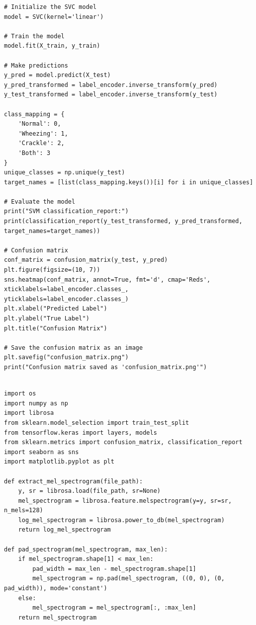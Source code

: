 \documentclass[conference]{IEEEtran}
\begin{document}
{\begin{lstlisting}[style=mypython, caption={Python code for SVM Model}]
# Initialize the SVC model
model = SVC(kernel='linear')

# Train the model
model.fit(X_train, y_train)

# Make predictions
y_pred = model.predict(X_test)
y_pred_transformed = label_encoder.inverse_transform(y_pred)
y_test_transformed = label_encoder.inverse_transform(y_test)

class_mapping = {
    'Normal': 0,
    'Wheezing': 1,
    'Crackle': 2,
    'Both': 3
}
unique_classes = np.unique(y_test)
target_names = [list(class_mapping.keys())[i] for i in unique_classes]

# Evaluate the model
print("SVM classification_report:")
print(classification_report(y_test_transformed, y_pred_transformed, target_names=target_names))

# Confusion matrix
conf_matrix = confusion_matrix(y_test, y_pred)
plt.figure(figsize=(10, 7))
sns.heatmap(conf_matrix, annot=True, fmt='d', cmap='Reds', xticklabels=label_encoder.classes_, yticklabels=label_encoder.classes_)
plt.xlabel("Predicted Label")
plt.ylabel("True Label")
plt.title("Confusion Matrix")

# Save the confusion matrix as an image
plt.savefig("confusion_matrix.png")
print("Confusion matrix saved as 'confusion_matrix.png'")
\end{lstlisting}





\begin{lstlisting}[style=mypython, caption={Code for training the CNN Model}, label={lst:cnn-model_train}]

import os
import numpy as np
import librosa
from sklearn.model_selection import train_test_split
from tensorflow.keras import layers, models
from sklearn.metrics import confusion_matrix, classification_report
import seaborn as sns
import matplotlib.pyplot as plt

def extract_mel_spectrogram(file_path):
    y, sr = librosa.load(file_path, sr=None)
    mel_spectrogram = librosa.feature.melspectrogram(y=y, sr=sr, n_mels=128)
    log_mel_spectrogram = librosa.power_to_db(mel_spectrogram)
    return log_mel_spectrogram

def pad_spectrogram(mel_spectrogram, max_len):
    if mel_spectrogram.shape[1] < max_len:
        pad_width = max_len - mel_spectrogram.shape[1]
        mel_spectrogram = np.pad(mel_spectrogram, ((0, 0), (0, pad_width)), mode='constant')
    else:
        mel_spectrogram = mel_spectrogram[:, :max_len]
    return mel_spectrogram


\end{lstlisting}}
\end{document}
